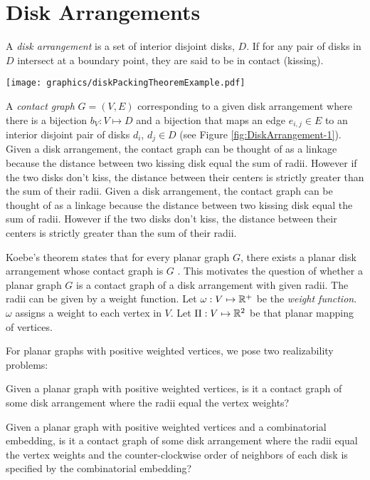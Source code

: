 \section{Disk Arrangements}\label{sec:disk}

 A \textit{disk arrangement} is a set of interior disjoint disks, $D$.  
 If for any pair of disks in $D$ intersect at a boundary point, they are said to be in contact (kissing).

\begin{minipage}{\linewidth}
\texttt{[image: graphics/diskPackingTheoremExample.pdf]}
\label{fig:DiskArrangement-1}
\end{minipage}

A \textit{contact graph} $G=(V,E)$ corresponding to a given disk arrangement where there is a bijection $b_V: V \mapsto D$ and a bijection that maps an edge $e_{i,j} \in E$ to an interior disjoint pair of disks $d_i$, $d_j \in D$ (see Figure \ref{fig:DiskArrangement-1}).
Given a disk arrangement, the contact graph can be thought of as a linkage because the distance between two kissing disk equal the sum of radii.  
However if the two disks don't kiss, the distance between their centers is strictly greater than the sum of their radii.
Given a disk arrangement, the contact graph can be thought of as a linkage because the distance between two kissing disk equal the sum of radii.  
However if the two disks don't kiss, the distance between their centers is strictly greater than the sum of their radii.

Koebe's theorem states that for every planar graph $G$, there exists a planar disk arrangement whose contact graph is $G$ \cite{koebe1936kontaktprobleme}.
This motivates the question of whether a planar graph $G$ is a contact graph of a disk arrangement with given radii.
The radii can be given by a weight function.
Let $\omega: V \mapsto {\mathbb{R}}^+$ be the \textit{weight function}.  
$\omega$ assigns a weight to each vertex in $V$.  
Let $\Pi:V \mapsto {\mathbb{R}}^2$ be that planar mapping of vertices.

For planar graphs with positive weighted vertices, we pose two realizability problems:
\begin{prob}\label{problem:UnorderedContactGraph}
Given a planar graph with positive weighted vertices, is it a contact graph of some disk arrangement where the radii equal the vertex weights?
\end{prob}
\begin{prob}\label{problem:OrderedContactGraph}
Given a planar graph with positive weighted vertices and a combinatorial embedding, is it a contact graph of some disk arrangement where the radii equal the vertex weights and the counter-clockwise order of neighbors of each disk is specified by the combinatorial embedding?
\end{prob}

